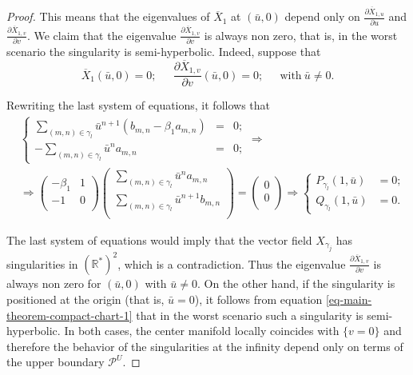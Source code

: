 \documentclass[12pt]{amsart}
\begin{document}
\begin{proof}
This means that the eigenvalues of $\overline{X}_{1}$ at $(\bar{u},0)$ depend only on $\frac{\partial \overline{X}_{1,u}}{\partial u}$ and $\frac{\partial \overline{X}_{1,v}}{\partial v}$. We claim that the eigenvalue $\frac{\partial \overline{X}_{1,v}}{\partial v}$ is always non zero, that is, in the worst scenario the singularity is semi-hyperbolic. Indeed, suppose that
$$
\overline{X}_{1}(\bar{u},0) =  0; \ \quad \ \frac{\partial \overline{X}_{1,v}}{\partial v}(\bar{u},0) = 0; \ \quad \ \text{with} \ \bar{u} \neq 0.$$

Rewriting the last system of equations, it follows that
\begin{align*}
&\left\{
  \begin{array}{ccl}
    \displaystyle\sum_{(m,n)\in\gamma_{l}}\bar{u}^{n+1}(b_{m,n}-\beta_{1}a_{m,n}) & = & 0; \\
    -\displaystyle\sum_{(m,n)\in\gamma_{l}}\bar{u}^{n}a_{m,n} & = & 0; 
  \end{array}
\right.\Rightarrow \\
& \Rightarrow
\left(
  \begin{array}{cc}
    -\beta_{1} & 1 \\
    -1 & 0 \\
  \end{array}
\right) 
\left(
  \begin{array}{c}
    \displaystyle\sum_{(m,n)\in\gamma_{l}}\bar{u}^{n}a_{m,n} \\
    \displaystyle\sum_{(m,n)\in\gamma_{l}}\bar{u}^{n+1}b_{m,n} \\
  \end{array}
\right) = \left(
  \begin{array}{c}
    0 \\
    0 \\
  \end{array}
\right) \Rightarrow  \left\{
  \begin{array}{rc}
    P_{\gamma_{l}}(1,\bar{u}) & = 0; \\
    Q_{\gamma_{l}}(1,\bar{u}) & = 0. 
  \end{array}
\right. 
\end{align*}

The last system of equations would imply that the vector field $X_{\gamma_{j}}$ has singularities in $(\mathbb{R}^{*})^{2}$, which is a contradiction. Thus the eigenvalue $\frac{\partial \overline{X}_{1,v}}{\partial v}$ is always non zero for $(\bar{u},0)$ with $\bar{u}\neq 0$. On the other hand, if the singularity is positioned at the origin (that is, $\bar{u} = 0$), it follows from equation \eqref{eq-main-theorem-compact-chart-1} that in the worst scenario such a singularity is semi-hyperbolic. In both cases, the center manifold locally coincides with $\{v = 0\}$ and therefore the behavior of the singularities at the infinity depend only on terms of the upper boundary $\mathcal{P}^{U}$.


\end{proof}
\end{document}
